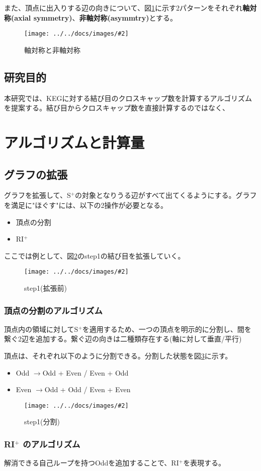 \documentclass[11pt,a4j]{jarticle}
\newcommand{\splus}{S${}^\text{+}$}
\newcommand{\riplus}{RI${}^\text{+}$}
\newcommand{\image}[4][height=100pt]{%
\begin{figure}[htbp]
    \centering
    \texttt{[image: ../../docs/images/\#2]}
    \caption{#3}
    \label{fig:#4}
\end{figure}%
}
\newcommand{\ra }{$\rightarrow$}
\newcommand{\tops}[2]{\texorpdfstring{#1}{#2}} %
\begin{document}
また、頂点に出入りする辺の向きについて、図\ref{fig:axis}に示す2パターンをそれぞれ\textbf{軸対称(axial symmetry)}、\textbf{非軸対称(asymmtry)}とする。
\image{about_axis.jpg}{軸対称と非軸対称}{axis}

\subsection{研究目的}
本研究では、KEGに対する結び目のクロスキャップ数を計算するアルゴリズムを提案する。結び目からクロスキャップ数を直接計算するのではなく、

\section{アルゴリズムと計算量}

\subsection{グラフの拡張}
グラフを拡張して、\splus の対象となりうる辺がすべて出てくるようにする。グラフを満足に"ほぐす"には、以下の2操作が必要となる。
\begin{itemize}
    \item 頂点の分割
    \item \riplus
\end{itemize}

ここでは例として、図\ref{fig:default}のstep1の結び目を拡張していく。
\image{extend_default.jpg}{step1(拡張前)}{default}

\subsubsection{頂点の分割のアルゴリズム}
頂点内の領域に対して\splus を適用するため、一つの頂点を明示的に分割し、間を繋ぐ2辺を追加する。繋ぐ辺の向きは二種類存在する(軸に対して垂直/平行)

頂点は、それぞれ以下のように分割できる。分割した状態を図\ref{fig:split}に示す。
\begin{itemize}
    \item Odd \ra  Odd + Even / Even + Odd
    \item Even \ra  Odd + Odd / Even + Even
\end{itemize}

\image{extend_split.jpg}{step1(分割)}{split}

\subsubsection{\tops{\riplus}{RI+} のアルゴリズム}
解消できる自己ループを持つOddを追加することで、\riplus を表現する。
\end{document}
